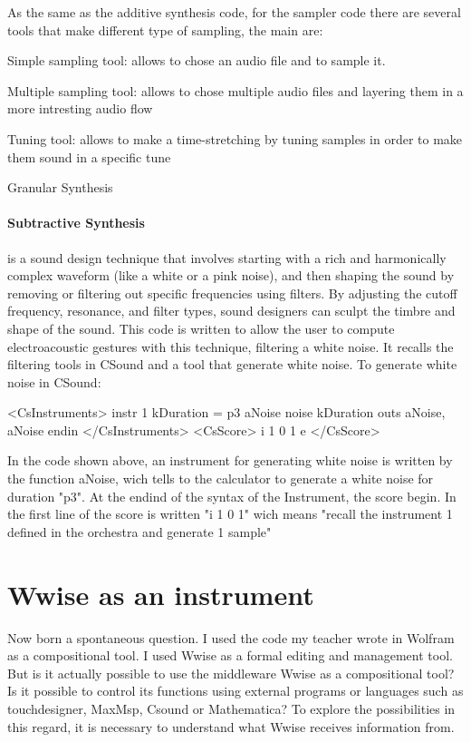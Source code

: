 		As the same as the additive synthesis code, for the sampler code there are several tools that make different type of sampling, the main are:
		
			\begin{compactitem}
				\item Simple sampling tool: allows to chose an audio file and to sample it.
				\item Multiple sampling tool: allows to chose multiple audio files and layering them in a more intresting audio flow
				\item Tuning tool: allows to make a time-stretching by tuning samples in order to make them sound in a specific tune
				\item Granular Synthesis
			\end{compactitem}
		
		\paragraph{Subtractive Synthesis} is a sound design technique that involves starting with a rich and harmonically complex waveform (like a white or a pink noise), and then shaping the sound by removing or filtering out specific frequencies using filters. By adjusting the cutoff frequency, resonance, and filter types, sound designers can sculpt the timbre and shape of the sound.
		This code is written to allow the user to compute electroacoustic gestures with this technique, filtering a white noise. It recalls the filtering tools in CSound and a tool that generate white noise. To generate white noise in CSound:
		
		\newpage
		
		\begin{code}
			<CsInstruments>
			instr 1
			kDuration = p3
			aNoise    noise kDuration
			outs aNoise, aNoise
			endin
			</CsInstruments>
			<CsScore>
			i 1 0 1
			e
			</CsScore>
		\end{code}
		
		In the code shown above, an instrument for generating white noise is written by the function aNoise, wich tells to the calculator to generate a white noise for duration "p3". At the endind of the syntax of the Instrument, the score begin. In the first line of the score is written "i 1 0 1" wich means "recall the instrument 1 defined in the orchestra and generate 1 sample"
		
	\section{Wwise as an instrument}
	Now born a spontaneous question. I used the code my teacher wrote in Wolfram as a compositional tool. I used Wwise as a formal editing and management tool.
	But is it actually possible to use the middleware Wwise as a compositional tool? Is it possible to control its functions using external programs or languages ​​such as touchdesigner, MaxMsp, Csound or Mathematica?
	To explore the possibilities in this regard, it is necessary to understand what Wwise receives information from.
	

